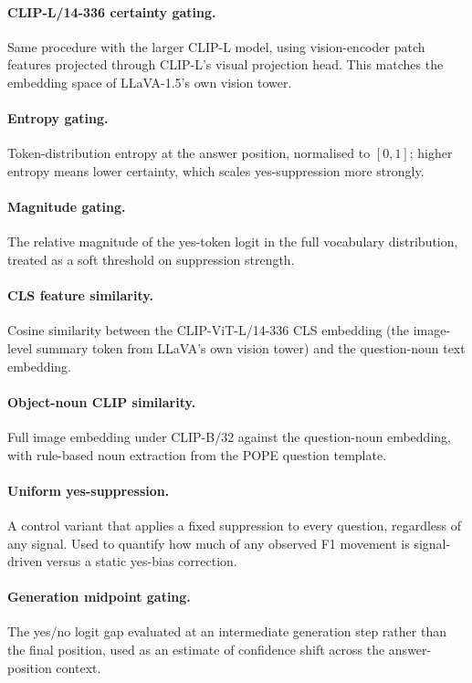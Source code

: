 \documentclass[11pt,letterpaper]{article}
\begin{document}
\paragraph{CLIP-L/14-336 certainty gating.} Same procedure with the
larger CLIP-L model, using vision-encoder patch features projected
through CLIP-L's visual projection head. This matches the embedding
space of LLaVA-1.5's own vision tower.

\paragraph{Entropy gating.} Token-distribution entropy at the answer
position, normalised to $[0,1]$; higher entropy means lower certainty,
which scales yes-suppression more strongly.

\paragraph{Magnitude gating.} The relative magnitude of the yes-token
logit in the full vocabulary distribution, treated as a soft threshold
on suppression strength.

\paragraph{CLS feature similarity.} Cosine similarity between the
CLIP-ViT-L/14-336 CLS embedding (the image-level summary token from
LLaVA's own vision tower) and the question-noun text embedding.

\paragraph{Object-noun CLIP similarity.} Full image embedding under
CLIP-B/32 against the question-noun embedding, with rule-based noun
extraction from the POPE question template.

\paragraph{Uniform yes-suppression.} A control variant that applies a
fixed suppression to every question, regardless of any signal. Used to
quantify how much of any observed F1 movement is signal-driven versus
a static yes-bias correction.

\paragraph{Generation midpoint gating.} The yes/no logit gap evaluated
at an intermediate generation step rather than the final position, used
as an estimate of confidence shift across the answer-position context.
\end{document}
